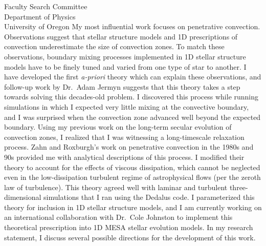 \documentclass[11pt]{letter}
\begin{document}
\begin{letter}{
               Faculty Search Committee \\
               Department of Physics \\
               University of Oregon
           }
    My most influential work focuses on penetrative convection.
    Observations suggest that stellar structure models and 1D prescriptions of convection underestimate the size of convection zones.
    To match these observations, boundary mixing processes implemented in 1D stellar structure models have to be finely tuned and varied from one type of star to another.
    I have developed the first \emph{a-priori} theory which can explain these observations, and follow-up work by Dr.~Adam Jermyn suggests that this theory takes a step towards solving this decades-old problem.
    I discovered this process while running simulations in which I expected very little mixing at the convective boundary, and I was surprised when the convection zone advanced well beyond the expected boundary.
    Using my previous work on the long-term secular evolution of convection zones, I realized that I was witnessing a long-timescale relaxation process.
    Zahn and Roxburgh's work on penetrative convection in the 1980s and 90s provided me with analytical descriptions of this process.
    I modified their theory to account for the effects of viscous dissipation, which cannot be neglected even in the low-dissipation turbulent regime of astrophysical flows (per the zeroth law of turbulence).
    This theory agreed well with laminar and turbulent three-dimensional simulations that I ran using the Dedalus code.
    I parameterized this theory for inclusion in 1D stellar structure models, and I am currently working on an international collaboration with Dr.~Cole Johnston to implement this theoretical prescription into 1D MESA stellar evolution models.
    In my research statement, I discuss several possible directions for the development of this work.


\end{letter}
\end{document}
